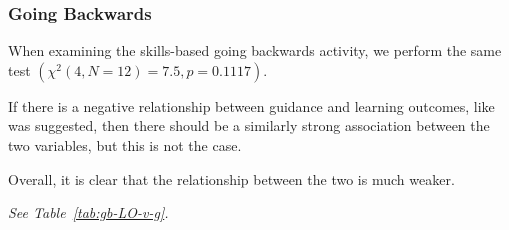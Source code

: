         \subsubsection*{Going Backwards}



            When examining the skills-based going backwards activity, we perform the same test $(\chi^2(4, N=12)=7.5,  p = 0.1117)$. %



If there is a negative relationship between guidance and learning outcomes, like was suggested, then there should be a similarly strong association between the two variables, but this is not the case. %



Overall, it is clear that the relationship between the two is much weaker. %



\emph{See Table~\ref{tab:gb-LO-v-g}.} 







